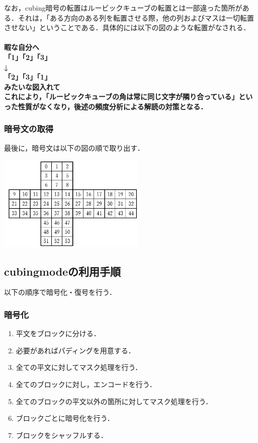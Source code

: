 \documentclass{jsarticle}
\begin{document}
なお，cubing暗号の転置はルービックキューブの転置とは一部違った箇所がある．それは，「ある方向のある列を転置させる際，他の列およびマスは一切転置させない」ということである．具体的には以下の図のような転置がなされる．\\
\\
\LARGE
\bf{暇な自分へ\\}
\normalsize
「1」「2」「3」\\
↓\\
「2」「3」「1」\\
みたいな図入れて\\

これにより，「ルービックキューブの角は常に同じ文字が隣り合っている」といった性質がなくなり，後述の頻度分析による解読の対策となる．


\subsubsection{暗号文の取得}
最後に，暗号文は以下の図の順で取り出す．
\begin{center}
  \includegraphics[width=7cm]{./tex_pic/seq.jpg}\\
\end{center}
\subsection{cubingmodeの利用手順}

以下の順序で暗号化・復号を行う．
\subsubsection{暗号化}
\begin{enumerate}
\item 平文をブロックに分ける．
\item 必要があればパディングを用意する．
\item 全ての平文に対してマスク処理を行う．
\item 全てのブロックに対し，エンコードを行う．
\item 全てのブロックの平文以外の箇所に対してマスク処理を行う．
\item ブロックごとに暗号化を行う．
\item ブロックをシャッフルする．
\end{enumerate}
\end{document}
